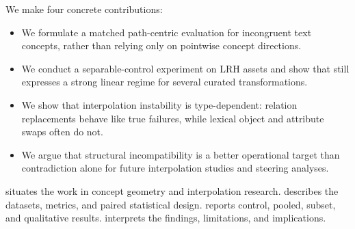  We make four concrete contributions:
\begin{itemize}[leftmargin=*,itemsep=0pt,topsep=2pt]
    \item We formulate a matched path-centric evaluation for incongruent text concepts, rather than relying only on pointwise concept directions.
    \item We conduct a separable-control experiment on LRH assets and show that \embmodel still expresses a strong linear regime for several curated transformations.
    \item We show that interpolation instability is type-dependent: relation replacements behave like true failures, while lexical object and attribute swaps often do not.
    \item We argue that structural incompatibility is a better operational target than contradiction alone for future interpolation studies and steering analyses.
\end{itemize}

  situates the work in concept geometry and interpolation research.  describes the datasets, metrics, and paired statistical design.  reports control, pooled, subset, and qualitative results.  interprets the findings, limitations, and implications.
